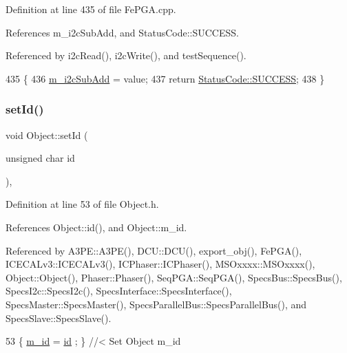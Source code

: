 Definition at line 435 of file Fe\+P\+G\+A.\+cpp.



References m\+\_\+i2c\+Sub\+Add, and Status\+Code\+::\+S\+U\+C\+C\+E\+SS.



Referenced by i2c\+Read(), i2c\+Write(), and test\+Sequence().


\begin{DoxyCode}
435                                                        \{
436   \hyperlink{classFePGA_aba8c2c8d8e0d136826b9dd4c2d7c2e90}{m\_i2cSubAdd} = value;
437   \textcolor{keywordflow}{return} \hyperlink{classStatusCode_a6f565cbeadc76d14c72f047e5e85eb4badd0da38d3ba0d922efd1f4619bc37ad8}{StatusCode::SUCCESS};
438 \}
\end{DoxyCode}
\mbox{\label{classObject_a398fe08cba594a0ce6891d59fe4f159f}} 
\subsubsection{\texorpdfstring{set\+Id()}{setId()}}
{\footnotesize\ttfamily void Object\+::set\+Id (\begin{DoxyParamCaption}\item[{unsigned char}]{id }\end{DoxyParamCaption})\hspace{0.3cm}{\ttfamily [inline]}, {\ttfamily [inherited]}}



Definition at line 53 of file Object.\+h.



References Object\+::id(), and Object\+::m\+\_\+id.



Referenced by A3\+P\+E\+::\+A3\+P\+E(), D\+C\+U\+::\+D\+C\+U(), export\+\_\+obj(), Fe\+P\+G\+A(), I\+C\+E\+C\+A\+Lv3\+::\+I\+C\+E\+C\+A\+Lv3(), I\+C\+Phaser\+::\+I\+C\+Phaser(), M\+S\+Oxxxx\+::\+M\+S\+Oxxxx(), Object\+::\+Object(), Phaser\+::\+Phaser(), Seq\+P\+G\+A\+::\+Seq\+P\+G\+A(), Specs\+Bus\+::\+Specs\+Bus(), Specs\+I2c\+::\+Specs\+I2c(), Specs\+Interface\+::\+Specs\+Interface(), Specs\+Master\+::\+Specs\+Master(), Specs\+Parallel\+Bus\+::\+Specs\+Parallel\+Bus(), and Specs\+Slave\+::\+Specs\+Slave().


\begin{DoxyCode}
53 \{ \hyperlink{classObject_aca74b9dbfed7b5556ea2d56c65b6b6b0}{m\_id}    = \hyperlink{classObject_af99145335cc61ff6e2798ea17db009d2}{id}    ; \} \textcolor{comment}{//< Set Object m\_id}
\end{DoxyCode}
\mbox{\label{classObject_ae30fea75683c2d149b6b6d17c09ecd0c}} 
